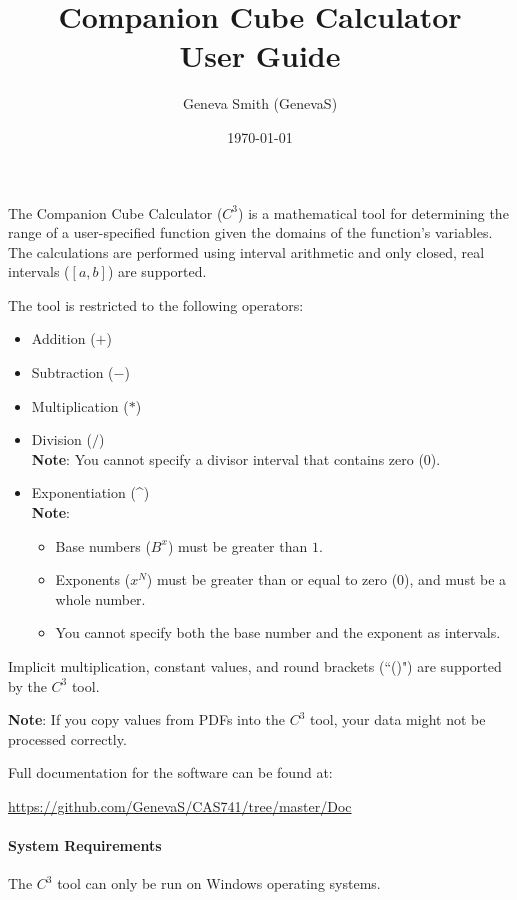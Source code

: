 \documentclass[12pt]{article}
\title{Companion Cube Calculator \\ User Guide}
\author{Geneva Smith (GenevaS)}
\date{\today}
\begin{document}
\maketitle

The Companion Cube Calculator ($C^3$) is a mathematical tool for determining 
the range of a user-specified function given the domains of the function's 
variables. The calculations are performed using interval arithmetic and only 
closed, real intervals ($[a,b]$) are supported.

The tool is restricted to the following operators:
\begin{itemize}
	\item Addition ($+$)
	\item Subtraction ($-$)
	\item Multiplication ($*$) 
	\item Division ($/$) \\ \textbf{Note}: You cannot specify a divisor 
	interval that contains zero ($0$).
	\item Exponentiation (\^{})  \\ \textbf{Note}:	
	\begin{itemize}
		\item Base numbers ($B^x$) must be greater than $1$.
		\item Exponents ($x^N$) must be greater than or equal to zero (0), and 
		must be a whole number.
		\item You cannot specify both the base number and the exponent as 
		intervals.
	\end{itemize}
\end{itemize} 

Implicit multiplication, constant values, and round brackets (``()") are 
supported by the $C^3$ tool.

\textbf{Note}: If you copy values from PDFs into the $C^3$ tool, your data 
might not be processed correctly.

Full documentation for the software can be found at:
\begin{center}
	\url{https://github.com/GenevaS/CAS741/tree/master/Doc}
\end{center}

\paragraph{System Requirements\\}
The $C^3$ tool can only be run on Windows operating systems.
\end{document}
